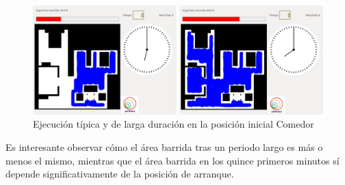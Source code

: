 \begin{figure}[H]
  \begin{center}
    \includegraphics[width=1.0\textwidth]{figures/Vacuum/ejecucionComedor.jpg}
		\caption{Ejecución típica y de larga duración en la posición inicial Comedor}
		\label{fig.ejecucionComedor}
		\end{center}
\end{figure}

Es interesante observar cómo el área barrida tras un periodo largo es más o menos el mismo, mientras que el área barrida en los quince primeros minutos sí depende significativamente de la posición de arranque.
